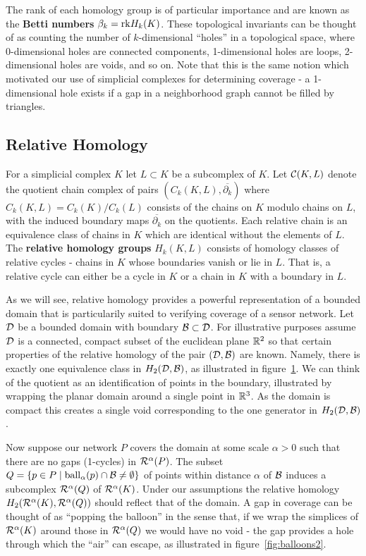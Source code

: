 The rank of each homology group is of particular importance and are known as the \textbf{Betti numbers} $\beta_k = \mathrm{rk} H_k(K)$.
These topological invariants can be thought of as counting the number of $k$-dimensional ``holes'' in a topological space, where 0-dimensional holes are connected components, 1-dimensional holes are loops, 2-dimensional holes are voids, and so on.
Note that this is the same notion which motivated our use of simplicial complexes for determining coverage - a 1-dimensional hole exists if a gap in a neighborhood graph cannot be filled by triangles.

\subsection{Relative Homology}

For a simplicial complex $K$ let $L\subset K$ be a subcomplex of $K$.
Let $\mathcal{C}(K, L)$ denote the quotient chain complex of pairs $(C_k(K, L), \overline{\partial_k})$ where $C_k(K, L) = C_k(K)/C_k(L)$ consists of the chains on $K$ modulo chains on $L$, with the induced boundary maps $\overline{\partial_k}$ on the quotients.
Each relative chain is an equivalence class of chains in $K$ which are identical without the elements of $L$.
The \textbf{relative homology groups} $H_k(K, L)$ consists of homology classes of relative cycles - chains in $K$ whose boundaries vanish or lie in $L$.
That is, a relative cycle can either be a cycle in $K$ or a chain in $K$ with a boundary in $L$.

As we will see, relative homology provides a powerful representation of a bounded domain that is particularily suited to verifying coverage of a sensor network.
Let ${\mathcal{D}}$ be a bounded domain with boundary ${\mathcal{B}}\subset{\mathcal{D}}$.
For illustrative purposes assume ${\mathcal{D}}$ is a connected, compact subset of the euclidean plane $\mathbb{R}^2$ so that certain properties of the relative homology of the pair $({\mathcal{D}}, {\mathcal{B}})$ are known.
Namely, there is exactly one equivalence class in $H_2({\mathcal{D}}, {\mathcal{B}})$, as illustrated in figure~\ref{fig:balloons1}.
We can think of the quotient as an identification of points in the boundary, illustrated by wrapping the planar domain around a single point in $\mathbb{R}^3$.
As the domain is compact this creates a single void corresponding to the one generator in $H_2({\mathcal{D}}, {\mathcal{B}})$.

\begin{figure}[htbp]
\centering
    \caption{}
    \label{fig:balloons1}
\end{figure}

Now suppose our network $P$ covers the domain at some scale $\alpha > 0$ such that there are no gaps (1-cycles) in $\mathcal{R}^\alpha(P)$.
The subset $Q = \{p\in P\mid \mathrm{ball}_\alpha(p)\cap{\mathcal{B}}\neq\emptyset\}$ of points within distance $\alpha$ of ${\mathcal{B}}$ induces a subcomplex $\mathcal{R}^\alpha(Q)$ of $\mathcal{R}^\alpha(K)$.
Under our assumptions the relative homology $H_2(\mathcal{R}^\alpha(K), \mathcal{R}^\alpha(Q))$ should reflect that of the domain.
A gap in coverage can be thought of as ``popping the balloon'' in the sense that, if we wrap the simplices of $\mathcal{R}^\alpha(K)$ around those in $\mathcal{R}^\alpha(Q)$ we would have no void - the gap provides a hole through which the ``air'' can escape, as illustrated in figure~\ref{fig:balloons2}.

